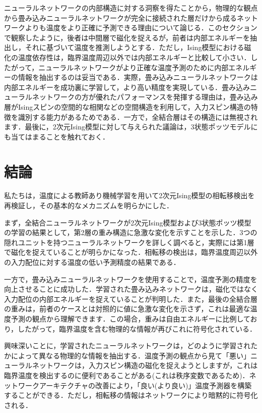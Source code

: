 \documentclass[a4paper,11pt]{jsreport}
\begin{document}
ニューラルネットワークの内部構造に対する洞察を得たことから，物理的な観点から畳み込みニューラルネットワークが完全に接続された層だけから成るネットワークよりも温度をより正確に予測できる理由について論じる．このセクションで観察したように，後者は中間層で磁化を捉えるが，前者は内部エネルギーを抽出し，それに基づいて温度を推測しようとする．ただし，Ising模型における磁化の温度依存性は，臨界温度周辺以外では内部エネルギーと比較して小さい．したがって，ニューラルネットワークがより正確な温度予測のために内部エネルギーの情報を抽出するのは妥当である．実際，畳み込みニューラルネットワークは内部エネルギーを成功裏に学習して，より高い精度を実現している．畳み込みニューラルネットワークの方が優れたパフォーマンスを発揮する理由は，畳み込み層がIsingスピンの空間的な相関などの空間構造を利用して，入力スピン構造の特徴を識別する能力があるためである．一方で，全結合層はその構造には無視されます．最後に，2次元Ising模型に対して与えられた議論は，3状態ポッツモデルにも当てはまることを触れておく．\par

\section{結論}
私たちは，温度による教師あり機械学習を用いて2次元Ising模型の相転移検出を再検証し，その基本的なメカニズムを明らかにした．\par
まず，全結合ニューラルネットワークが2次元Ising模型および3状態ポッツ模型の学習の結果として，第2層の重み構造に急激な変化を示すことを示した．3つの隠れユニットを持つニューラルネットワークを詳しく調べると，実際には第1層で磁化を捉えていることが明らかになった．相転移の検出は，臨界温度周辺以外の入力配位に対する温度の低い予測精度の結果である．\par
一方で，畳み込みニューラルネットワークを使用することで，温度予測の精度を向上させることに成功した．学習された畳み込みネットワークは，磁化ではなく入力配位の内部エネルギーを捉えていることが判明した．また，最後の全結合層の重みは，前者のケースとは対照的に値に急激な変化を示さず，これは最適な温度予測の観点から理解できます．この場合，重みは自由エネルギーに比例しており，したがって，臨界温度を含む物理的な情報が再びこれに符号化されている．\par
興味深いことに，学習されたニューラルネットワークは，どのように学習されたかによって異なる物理的な情報を抽出する．温度予測の観点から見て「悪い」ニューラルネットワークは，入力スピン構造の磁化を捉えようとしますが，これは臨界温度を検出するのに便利であることがある(これは秩序変数であるため)．ネットワークアーキテクチャの改善により，「良い(より良い)」温度予測器を構築することができる．ただし，相転移の情報はネットワークにより暗黙的に符号化される．
\end{document}
